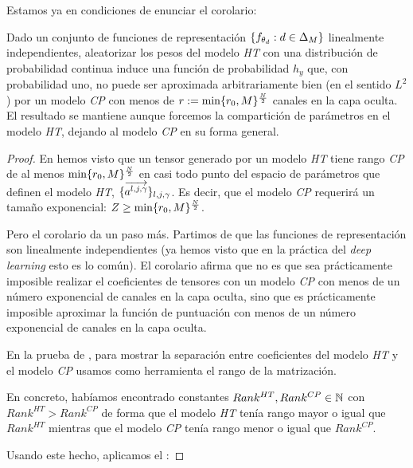 Estamos ya en condiciones de enunciar el corolario:

\begin{corolario}
    Dado un conjunto de funciones de representación $\{ f_{\theta_d}: d \in \Delta_{M} \}$ linealmente independientes, aleatorizar los pesos del modelo \textit{HT} con una distribución de probabilidad continua induce una función de probabilidad $h_y$ que, con probabilidad uno, no puede ser aproximada arbitrariamente bien (en el sentido $L^2$ ) por un modelo \textit{CP} con menos de $r := \min \{ r_0, M \}^{\frac{N}{2}}$ canales en la capa oculta. El resultado se mantiene aunque forcemos la compartición de parámetros en el modelo \textit{HT}, dejando al modelo \textit{CP} en su forma general.
\end{corolario}

\begin{proof}
    En  hemos visto que un tensor generado por un modelo \textit{HT} tiene rango \textit{CP} de al menos $\min \{ r_0, M \}^{\frac{N}{2}}$  en casi todo punto del espacio de parámetros que definen el modelo \textit{HT}, $\{ \overrightarrow{a^{l, j, \gamma}} \}_{l, j, \gamma}$. Es decir, que el modelo \textit{CP} requerirá un tamaño exponencial: $Z \geq \min \{ r_0, M \}^{\frac{N}{2}}$.

    Pero el corolario da un paso más. Partimos de que las funciones de representación son linealmente independientes (ya hemos visto que en la práctica del \textit{deep learning} esto es lo común). El corolario afirma que no es que sea prácticamente imposible realizar el coeficientes de tensores con un modelo \textit{CP} con menos de un número exponencial de canales en la capa oculta, sino que es prácticamente imposible aproximar la función de puntuación con menos de un número exponencial de canales en la capa oculta.

    En la prueba de , para mostrar la separación entre coeficientes del modelo \textit{HT} y el modelo \textit{CP} usamos como herramienta el rango de la matrización.

    En concreto, habíamos encontrado constantes $Rank^{HT}, Rank^{CP} \in \mathbb{N}$ con $Rank^{HT} > Rank^{CP}$ de forma que el modelo \textit{HT} tenía rango mayor o igual que $Rank^{HT}$ mientras que el modelo \textit{CP} tenía rango menor o igual que $Rank^{CP}$.

    Usando este hecho, aplicamos el :


\end{proof}

